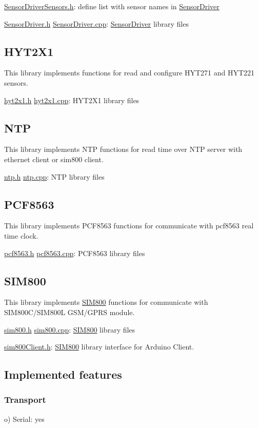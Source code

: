 \hyperlink{SensorDriverSensors_8h}{Sensor\+Driver\+Sensors.\+h}\+: define list with sensor names in \hyperlink{classSensorDriver}{Sensor\+Driver}

\hyperlink{SensorDriver_8h}{Sensor\+Driver.\+h} \hyperlink{SensorDriver_8cpp}{Sensor\+Driver.\+cpp}\+: \hyperlink{classSensorDriver}{Sensor\+Driver} library files\hypertarget{index_HYT2X1}{}\subsection{H\+Y\+T2\+X1}\label{index_HYT2X1}
This library implements functions for read and configure H\+Y\+T271 and H\+Y\+T221 sensors.

\hyperlink{hyt2x1_8h}{hyt2x1.\+h} \hyperlink{hyt2x1_8cpp}{hyt2x1.\+cpp}\+: H\+Y\+T2\+X1 library files\hypertarget{index_NTP}{}\subsection{N\+TP}\label{index_NTP}
This library implements N\+TP functions for read time over N\+TP server with ethernet client or sim800 client.

\hyperlink{ntp_8h}{ntp.\+h} \hyperlink{ntp_8cpp}{ntp.\+cpp}\+: N\+TP library files\hypertarget{index_PCF8563}{}\subsection{P\+C\+F8563}\label{index_PCF8563}
This library implements P\+C\+F8563 functions for communicate with pcf8563 real time clock.

\hyperlink{pcf8563_8h}{pcf8563.\+h} \hyperlink{pcf8563_8cpp}{pcf8563.\+cpp}\+: P\+C\+F8563 library files\hypertarget{index_SIM800}{}\subsection{S\+I\+M800}\label{index_SIM800}
This library implements \hyperlink{classSIM800}{S\+I\+M800} functions for communicate with S\+I\+M800\+C/\+S\+I\+M800L G\+S\+M/\+G\+P\+RS module.

\hyperlink{sim800_8h}{sim800.\+h} \hyperlink{sim800_8cpp}{sim800.\+cpp}\+: \hyperlink{classSIM800}{S\+I\+M800} library files

\hyperlink{sim800Client_8h}{sim800\+Client.\+h}\+: \hyperlink{classSIM800}{S\+I\+M800} library interface for Arduino Client.\hypertarget{index_implemented}{}\subsection{Implemented features}\label{index_implemented}
\hypertarget{index_transport}{}\subsubsection{Transport}\label{index_transport}
o) Serial\+: yes

